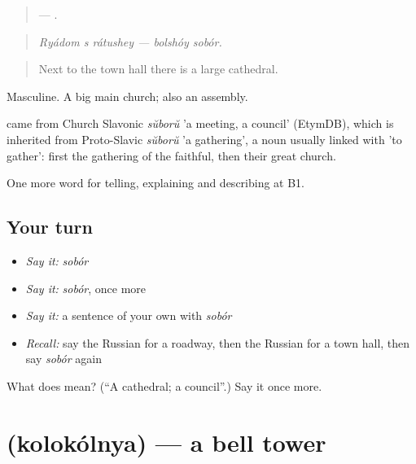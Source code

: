 \begin{quote}
   —  .
\end{quote}

\begin{quote}
\emph{Ryádom s rátushey — bolshóy sobór.}
\end{quote}

\begin{quote}
Next to the town hall there is a large cathedral.
\end{quote}

Masculine. A big main church; also an assembly.

\begin{cousinweb}
\emph{} came from Church Slavonic \emph{sŭborŭ} 'a meeting, a council' (EtymDB), which is inherited from Proto-Slavic \emph{sŭborŭ} 'a gathering', a noun usually linked with \emph{} 'to gather': first the gathering of the faithful, then their great church.
\end{cousinweb}

\begin{grammarlens}[title={What you've built}]
One more word for telling, explaining and describing at B1.
\end{grammarlens}

\subsection*{Your turn}
\begin{itemize}
\raggedright
  \item \emph{Say it:} \emph{sobór}
  \item \emph{Say it:} \emph{sobór}, once more
  \item \emph{Say it:} a sentence of your own with \emph{sobór}
  \item \emph{Recall:} say the Russian for a roadway, then the Russian for a town hall, then say \emph{sobór} again
\end{itemize}

\begin{tcolorbox}[breakable,colback=teal!4,colframe=teal!35!black,title={Before you move on}]
What does  mean? (\textquotedblleft{}A cathedral; a council\textquotedblright{}.) Say it once more.
\end{tcolorbox}
\section[\texorpdfstring{\ru{колокольня} (kolokólnya)}{колокольня (kolokólnya)}]{ (kolokólnya) — a bell tower}

